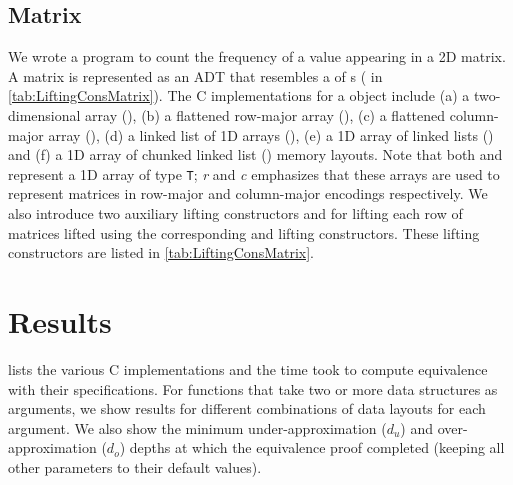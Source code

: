 \subsection{Matrix}
\label{sec:expmat}
\vspace{-5px}
We wrote a \SpecL{} program to count the frequency of a value appearing in a 2D matrix.
A matrix is represented as an ADT that resembles a  of s ( in \cref{tab:LiftingConsMatrix}).
The C implementations for a  object include
(a) a two-dimensional array (), (b) a flattened row-major array (),
(c) a flattened column-major array (), (d) a linked list of 1D arrays (),
(e) a 1D array of linked lists () and (f) a 1D array of chunked linked list ()
memory layouts. Note that both  and  represent a 1D array of type {\tt T}; {\em r} and {\em c}
emphasizes that these arrays are used to represent matrices in row-major and column-major encodings respectively.
We also introduce two auxiliary lifting constructors  and 
for lifting each row of matrices lifted using the corresponding  and   lifting
constructors. These lifting constructors are listed in \cref{tab:LiftingConsMatrix}.

   

\section{Results}
\label{sec:results}
 lists the various C implementations and the time \toolName{} took
to compute equivalence with their specifications. For functions that
take two or more data structures as arguments, we show
results for different combinations of data layouts for each argument.
We also show the minimum under-approximation ($d_u$) and over-approximation ($d_o$) depths
at which the equivalence proof completed (keeping all other parameters to their
default values).

